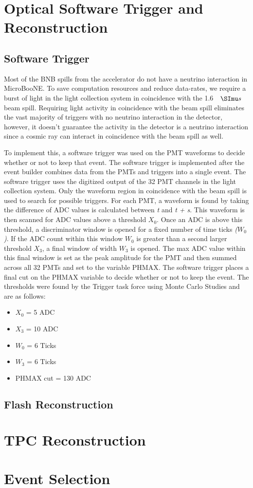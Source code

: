 \section{Optical Software Trigger and Reconstruction}
\subsection{Software Trigger}
Most of the BNB spills from the accelerator do not have a neutrino interaction in MicroBooNE. To save computation resources and reduce data-rates, we require a burst of light in the light collection system in coincidence with the 1.6 $\micro s $ beam spill. Requiring light activity in coincidence with the beam spill eliminates the vast majority of triggers with no neutrino interaction in the detector, however, it doesn't guarantee the activity in the detector is a neutrino interaction since a cosmic ray can interact in coincidence with the beam spill as well.

To implement this, a software trigger was used on the PMT waveforms to decide whether or not to keep that event. The software trigger is implemented after the event builder combines data from the PMTs and triggers into a single event. The software trigger uses the digitized output of the 32 PMT channels in the light collection system. Only the waveform region in coincidence with the beam spill is used to search for possible triggers. For each PMT, a waveform is found by taking the difference of ADC values is calculated between \textit{t} and \textit{t + s}. This waveform is then scanned for ADC values above a threshold \textit{$X_0$}. Once an ADC is above this threshold, a discriminator window is opened for a fixed number of time ticks \textit{($W_0$)}. If the ADC count within this window \textit{$W_0$} is greater than a second larger threshold \textit{$X_3$}, a final window of width \textit{$W_3$} is opened. The max ADC value within this final window is set as the peak amplitude for the PMT and then summed across all 32 PMTs and set to the variable PHMAX. The software trigger places a final cut on the PHMAX variable to decide whether or not to keep the event. The thresholds were found by the Trigger task force using Monte Carlo Studies 
and are as follows: 
\begin{itemize}
\item{$X_0$ = 5 ADC} 
\item{$X_3$ = 10 ADC} 
\item{$W_0$ = 6 Ticks} 
\item{$W_3$ = 6 Ticks} 
\item{PHMAX cut = 130 ADC}
\end{itemize}

\subsection{Flash Reconstruction}

\section{TPC Reconstruction}
\section{Event Selection}
